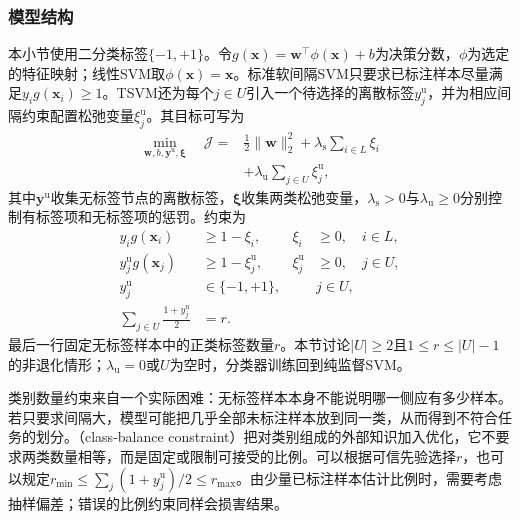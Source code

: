 \subsubsection{模型结构}
\label{sec:classification-tsvm-structure}

本小节使用二分类标签$\{-1,+1\}$。令$g(\bm{x})=\bm{w}^{\top}\phi(\bm{x})+b$为决策分数，$\phi$为选定的特征映射；线性SVM取$\phi(\bm{x})=\bm{x}$。标准软间隔SVM只要求已标注样本尽量满足$y_i g(\bm{x}_i)\geq1$。TSVM还为每个$j\in U$引入一个待选择的离散标签$y_j^{\mathrm{u}}$，并为相应间隔约束配置松弛变量$\xi_j^{\mathrm{u}}$。其目标可写为
\begin{equation}
  \label{eq:classification-tsvm-objective}
  \begin{aligned}
    \min_{\bm{w},b,\bm{y}^{\mathrm{u}},\bm{\xi}}\quad
    \mathcal{J}
      ={}&\frac12\lVert\bm{w}\rVert_2^2
         +\lambda_{\mathrm{s}}\sum_{i\in L}\xi_i\\
       &+\lambda_{\mathrm{u}}\sum_{j\in U}\xi_j^{\mathrm{u}},
  \end{aligned}
\end{equation}
其中$\bm{y}^{\mathrm{u}}$收集无标签节点的离散标签，$\bm{\xi}$收集两类松弛变量，$\lambda_{\mathrm{s}}>0$与$\lambda_{\mathrm{u}}\geq0$分别控制有标签项和无标签项的惩罚。约束为
\begin{equation}
  \label{eq:classification-tsvm-constraints}
  \begin{aligned}
    y_i g(\bm{x}_i)&\geq1-\xi_i,
      &\xi_i&\geq0,\quad i\in L,\\
    y_j^{\mathrm{u}}g(\bm{x}_j)&\geq1-\xi_j^{\mathrm{u}},
      &\xi_j^{\mathrm{u}}&\geq0,\quad j\in U,\\
    y_j^{\mathrm{u}}&\in\{-1,+1\},
      &&j\in U,\\
    \sum_{j\in U}\frac{1+y_j^{\mathrm{u}}}{2}&=r.
  \end{aligned}
\end{equation}
最后一行固定无标签样本中的正类标签数量$r$。本节讨论$|U|\geq2$且$1\leq r\leq|U|-1$的非退化情形；$\lambda_{\mathrm{u}}=0$或$U$为空时，分类器训练回到纯监督SVM。

类别数量约束来自一个实际困难：无标签样本本身不能说明哪一侧应有多少样本。若只要求间隔大，模型可能把几乎全部未标注样本放到同一类，从而得到不符合任务的划分。（class-balance constraint）把对类别组成的外部知识加入优化，它不要求两类数量相等，而是固定或限制可接受的比例。可以根据可信先验选择$r$，也可以规定$r_{\min}\leq\sum_j(1+y_j^{\mathrm{u}})/2\leq r_{\max}$。由少量已标注样本估计比例时，需要考虑抽样偏差；错误的比例约束同样会损害结果。

